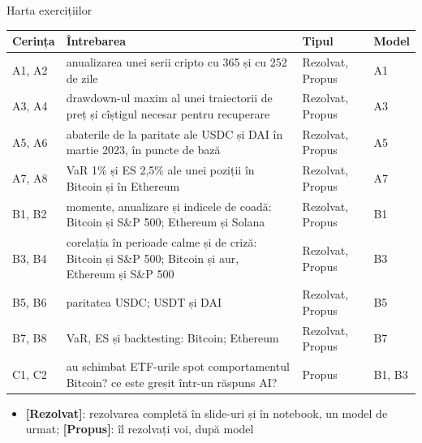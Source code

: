 \begin{frame}{Harta exercițiilor}
\itemsize{\footnotesize}
\begin{center}
\scriptsize
\begin{tabular}{>{\raggedright\arraybackslash}p{1.1cm}>{\raggedright\arraybackslash}p{7.5cm}>{\raggedright\arraybackslash}p{1.9cm}>{\raggedright\arraybackslash}p{1.4cm}}
\toprule
\textbf{Cerința} & \textbf{Întrebarea} & \textbf{Tipul} & \textbf{Model} \\
\midrule
A1, A2 & anualizarea unei serii cripto cu 365 și cu 252 de zile & Rezolvat, Propus & A1 \\
A3, A4 & drawdown-ul maxim al unei traiectorii de preț și cîștigul necesar pentru recuperare & Rezolvat, Propus & A3 \\
A5, A6 & abaterile de la paritate ale USDC și DAI în martie 2023, în puncte de bază & Rezolvat, Propus & A5 \\
A7, A8 & VaR 1\% și ES 2,5\% ale unei poziții în Bitcoin și în Ethereum & Rezolvat, Propus & A7 \\
B1, B2 & momente, anualizare și indicele de coadă: Bitcoin și S\&P 500; Ethereum și Solana & Rezolvat, Propus & B1 \\
B3, B4 & corelația în perioade calme și de criză: Bitcoin și S\&P 500; Bitcoin și aur, Ethereum și S\&P 500 & Rezolvat, Propus & B3 \\
B5, B6 & paritatea USDC; USDT și DAI & Rezolvat, Propus & B5 \\
B7, B8 & VaR, ES și backtesting: Bitcoin; Ethereum & Rezolvat, Propus & B7 \\
C1, C2 & au schimbat ETF-urile spot comportamentul Bitcoin? ce este greșit într-un răspuns AI? & Propus & B1, B3 \\
\bottomrule
\end{tabular}
\end{center}
\begin{itemize}
    \item \textbf{[Rezolvat]}: rezolvarea completă în slide-uri și în notebook, un model de urmat; \textbf{[Propus]}: îl rezolvați voi, după model
\end{itemize}
\end{frame}

